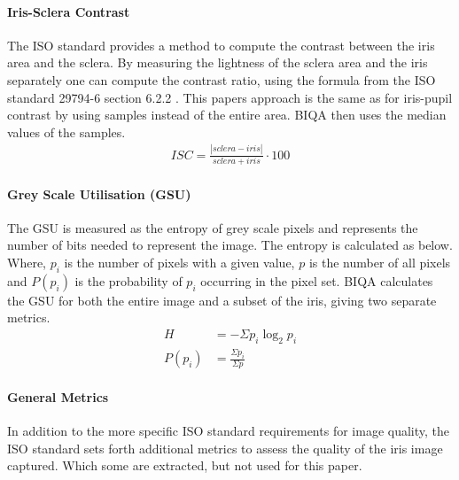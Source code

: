 \paragraph{Iris-Sclera Contrast}
The ISO standard provides a method to compute the contrast between the iris area
and the sclera. By measuring the lightness of the sclera area and the iris 
separately one can compute the contrast ratio, using the formula from the ISO
standard 29794-6 section 6.2.2 \cite{iso}.  This papers approach is the same as
for iris-pupil contrast by using samples instead of the entire area. BIQA then
uses the median values of the samples.
\vspace{-3mm}
\begin{align}
	ISC = \frac{|sclera - iris|}{sclera + iris} \cdot 100
\end{align}




\paragraph{Grey Scale Utilisation (GSU)}
The GSU is measured as the entropy of grey scale pixels and represents
the number of bits needed to represent the image.  The entropy is calculated as
below. Where, $p_i$ is the number of pixels with a given value, $p$ is the
number of all pixels and $P(p_i)$ is the probability of $p_i$ occurring in the 
pixel set.  BIQA calculates the GSU for both the entire image and a subset of 
the iris, giving two separate metrics.
\vspace{-3mm}
\begin{align}
	H &= -\Sigma p_i \log_2 p_i \\
	P(p_i) &= \frac{ \Sigma{p_i} }{ \Sigma{p} }
\end{align}



\paragraph{General Metrics}
In addition to the more specific ISO standard requirements for image quality,
the ISO standard\cite{iso} sets forth additional metrics to assess the quality
of the iris image captured.  Which some are extracted, but not used for this
paper.


